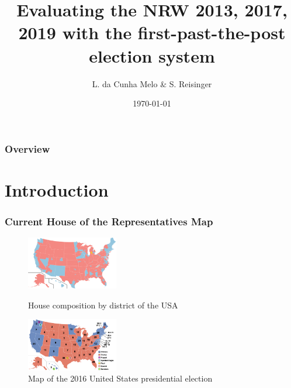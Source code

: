 \documentclass{beamer}
\title[First-past-the-post election system]{Evaluating the NRW 2013, 2017, 2019 with the first-past-the-post election system} %
\author{L. da Cunha Melo \& S. Reisinger} %
\institute[] %
{
TU Wien \\ %
\medskip
\textit{} %
}
\date{\today} %
\begin{document}
\begin{frame}
\titlepage %
\end{frame}

\begin{frame}
\frametitle{Overview} %
\tableofcontents %
\end{frame}


\section{Introduction} 

\begin{frame}
\frametitle{Current House of the Representatives Map}
\begin{figure}[h]
\centering
\includegraphics[width=4cm]{images/us_map.png}
\caption{House composition by district of the USA}\label{fig:mapOfResults}
\bigbreak
\includegraphics[width=4cm]{images/US_2016_Election.png}
\caption{Map of the 2016 United States presidential election}\label{fig:mapOfResultsPresidential}
\end{figure}
\end{frame}
\end{document}
